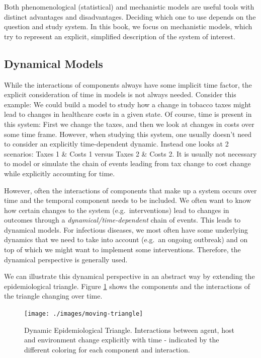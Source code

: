 \documentclass[
]{book}
\begin{document}
Both phenomenological (statistical) and mechanistic models are useful tools with distinct advantages and disadvantages. Deciding which one to use depends on the question and study system. In this book, we focus on mechanistic models, which try to represent an explicit, simplified description of the system of interest.

\hypertarget{dynamical-models}{%
\subsection{Dynamical Models}\label{dynamical-models}}

While the interactions of components always have some implicit time factor, the explicit consideration of time in models is not always needed. Consider this example: We could build a model to study how a change in tobacco taxes might lead to changes in healthcare costs in a given state. Of course, time is present in this system: First we change the taxes, and then we look at changes in costs over some time frame. However, when studying this system, one usually doesn't need to consider an explicitly time-dependent dynamic. Instead one looks at 2 scenarios: Taxes 1 \& Costs 1 versus Taxes 2 \& Costs 2. It is usually not necessary to model or simulate the chain of events leading from tax change to cost change while explicitly accounting for time.

However, often the interactions of components that make up a system occurs over time and the temporal component needs to be included. We often want to know how certain changes to the system (e.g.~interventions) lead to changes in outcomes through a \emph{dynamical/time-dependent} chain of events. This leads to dynamical models. For infectious diseases, we most often have some underlying dynamics that we need to take into account (e.g.~an ongoing outbreak) and on top of which we might want to implement some interventions. Therefore, the dynamical perspective is generally used.

We can illustrate this dynamical perspective in an abstract way by extending the epidemiological triangle. Figure \ref{fig:dynamictriangle} shows the components and the interactions of the triangle changing over time.

\begin{figure}
\texttt{[image: ./images/moving-triangle]} \caption{Dynamic Epidemiological Triangle. Interactions between agent, host and environment change explicitly with time - indicated by the different coloring for each component and interaction.}\label{fig:dynamictriangle}
\end{figure}
\end{document}
